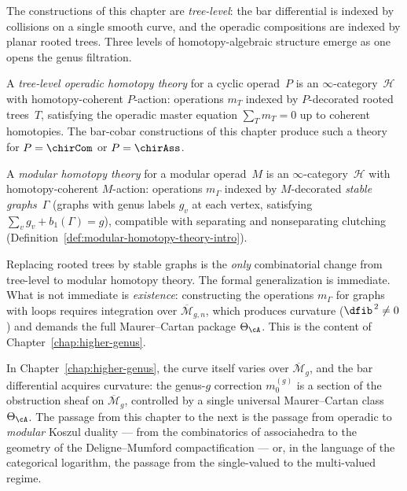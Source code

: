 The constructions of this chapter are \emph{tree-level}: the bar
differential is indexed by collisions on a single smooth curve, and
the operadic compositions are indexed by planar rooted trees.  Three
levels of homotopy-algebraic structure emerge as one opens the genus
filtration.

\begin{definition}
\label{def:tree-level-homotopy}
A \emph{tree-level operadic homotopy theory} for a cyclic operad~$P$
is an $\infty$-category~$\mathcal{H}$ with homotopy-coherent
$P$-action: operations $m_T$ indexed by $P$-decorated rooted
trees~$T$, satisfying the operadic master equation $\sum_T m_T = 0$
up to coherent homotopies.  The bar-cobar constructions of this
chapter produce such a theory for $P = \chirCom$ or $P = \chirAss$.
\end{definition}

\begin{definition}
\label{def:modular-homotopy-abstract}
A \emph{modular homotopy theory} for a modular operad~$M$ is an
$\infty$-category~$\mathcal{H}$ with homotopy-coherent $M$-action:
operations $m_\Gamma$ indexed by $M$-decorated \emph{stable
graphs}~$\Gamma$ (graphs with genus labels $g_v$ at each vertex,
satisfying $\sum_v g_v + b_1(\Gamma) = g$), compatible with
separating and nonseparating clutching
(Definition~\ref{def:modular-homotopy-theory-intro}).
\end{definition}

\begin{remark}
\label{rem:trees-to-graphs}
Replacing rooted trees by stable graphs is the
\emph{only} combinatorial change from tree-level to modular homotopy
theory.  The formal generalization is immediate.  What is not
immediate is \emph{existence}: constructing the operations $m_\Gamma$
for graphs with loops requires integration over
$\overline{\mathcal{M}}_{g,n}$, which produces curvature
($\dfib^{\,2} \neq 0$) and demands the full Maurer--Cartan package
$\Theta_\cA$.  This is the content of
Chapter~\ref{chap:higher-genus}.
\end{remark}

\medskip

In Chapter~\ref{chap:higher-genus}, the curve itself varies over
$\overline{\mathcal{M}}_g$, and the bar differential acquires
curvature: the genus-$g$ correction $m_0^{(g)}$ is a section of the
obstruction sheaf on $\overline{\mathcal{M}}_g$, controlled by a
single universal Maurer--Cartan class $\Theta_{\cA}$.  The passage
from this chapter to the next is the passage from operadic to
\emph{modular} Koszul duality --- from the combinatorics of
associahedra to the geometry of the Deligne--Mumford
compactification --- or, in the language of the categorical logarithm,
the passage from the single-valued to the multi-valued regime.
